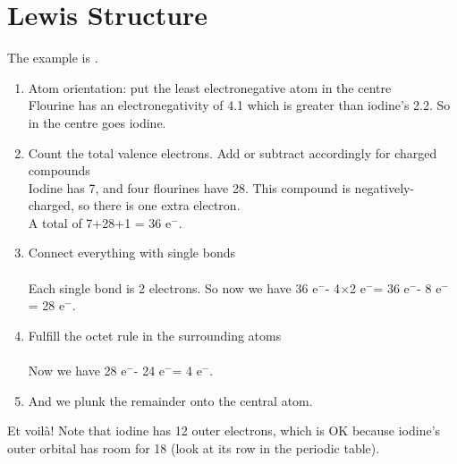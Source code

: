 \documentclass[a4paper, 8pt]{memoir}
\newcommand*{\el}{e$^-$}
\begin{document}
\chapter{Lewis Structure}
The example is \ce{[FI_{4}]^{-}}.
\begin{enumerate}
\item Atom orientation: put the least electronegative atom in the centre \\
Flourine has an electronegativity of 4.1 which is greater than iodine's 2.2. So in the centre goes iodine.
\item Count the total valence electrons. Add or subtract accordingly for charged compounds  \\
Iodine has 7, and four flourines have 28. This compound is negatively-charged, so there is one extra electron.  \\
A total of 7+28+1 = 36 \el.
\item Connect everything with single bonds \\
 \\
Each single bond is 2 electrons. So now we have 36 \el - 4$\times$2 \el = 36 \el - 8 \el = 28 \el.
\item Fulfill the octet rule in the surrounding atoms \\
 \\
Now we have 28 \el - 24 \el = 4 \el.
\item And we plunk the remainder onto the central atom. \\
\end{enumerate}

Et voilà! Note that iodine has 12 outer electrons, which is OK because iodine's outer orbital has room for 18 (look at its row in the periodic table).
\end{document}
